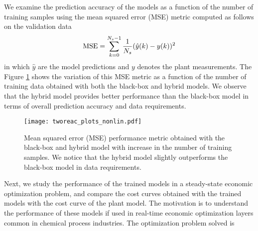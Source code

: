 \documentclass{article}
\begin{document}
We examine the prediction accuracy of the models as a function of the number of
training samples using the mean squared error (MSE) metric computed as follows
on the validation data
\begin{align*}
  \textnormal{MSE} =  \sum_{k=0}^{N_s-1} 
  \dfrac{1}{N_s}(\hat{y}(k) - y(k))^2
\end{align*}
in which $\hat{y}$ are the model predictions and $y$ denotes the plant
measurements. The Figure \ref{fig:validation_mse} shows the variation of this
MSE metric as a function of the number of training data obtained with both the
black-box and hybrid models. We observe that the hybrid model provides better
performance than the black-box model in terms of overall prediction accuracy and
data requirements.

\begin{figure}[!h]
  \centering
  \texttt{[image: tworeac\_plots\_nonlin.pdf]}
  \caption{Mean squared error (MSE) performance metric obtained with the
           black-box and hybrid model with increase in the number of training
           samples. We notice that the hybrid model slightly outperforms the
           black-box model in data requirements.}
  \label{fig:validation_mse}
\end{figure}

Next, we study the performance of the trained models in a steady-state economic
optimization problem, and compare the cost curves obtained with the trained
models with the cost curve of the plant model. The motivation is to understand
the performance of these models if used in real-time economic optimization
layers common in chemical process industries. The optimization problem solved is
\end{document}
